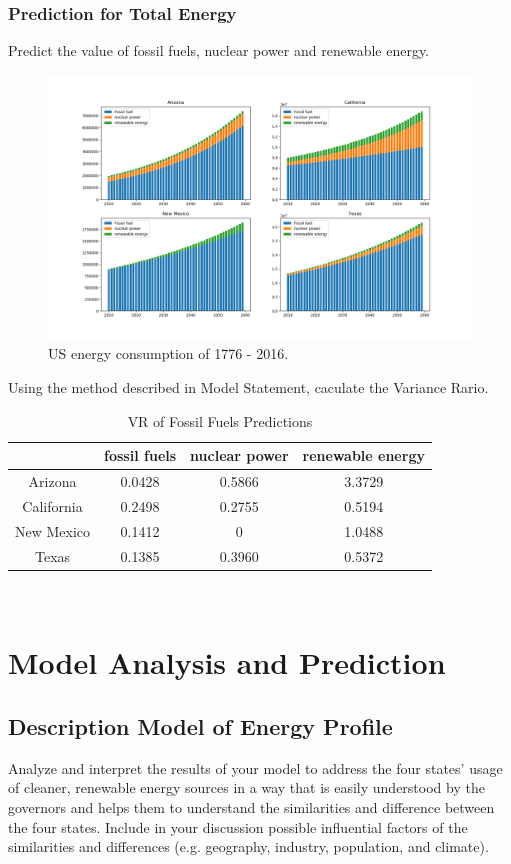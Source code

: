 \documentclass{mcmthesis}
\begin{document}
\subsubsection{Prediction for Total Energy}
Predict the value of fossil fuels, nuclear power and renewable energy.
  \begin{figure}[htbp]
    \centering
    \includegraphics[width=\textwidth]{figures//figure6.png}
    \caption{US energy consumption of 1776 - 2016.}
  \end{figure}
	Using the method described in Model Statement, caculate the Variance Rario.
	\begin{table}[!h]
  			\centering
  			\begin{tabular}{cccc}
			\toprule  %
    		 & fossil fuels & nuclear power & renewable energy\\
			\midrule  %
			Arizona & 0.0428 & 0.5866 & 3.3729 \\
			\midrule
			California & 0.2498 & 0.2755 & 0.5194\\
			\midrule
			New Mexico & 0.1412 & 0 & 1.0488 \\
			\midrule
			Texas & 0.1385 & 0.3960 & 0.5372\\
			\bottomrule %
			\end{tabular}
			\caption{VR of Fossil Fuels Predictions}
			\end{table}\\


\section{Model Analysis and Prediction}
%
\subsection{Description Model of Energy Profile}
 Analyze and interpret the results of your model to address the four states’ usage of cleaner, renewable energy sources in a way that is easily understood by the governors and helps them to understand the similarities and difference between the four states. Include in your discussion possible influential factors of the similarities and differences (e.g. geography, industry, population, and climate).  
\end{document}
